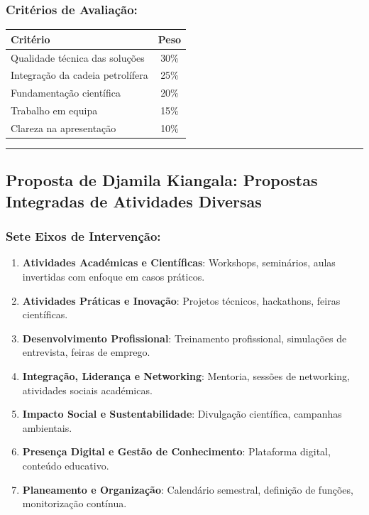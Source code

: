 \documentclass[12pt,a4paper]{article}
\begin{document}
\subsubsection*{Critérios de Avaliação:}
\begin{center}
\small
\begin{tabular}{lc}
\toprule
\textbf{\color{spe-blue}Critério} & \textbf{\color{spe-blue}Peso} \\
\midrule
Qualidade técnica das soluções & 30\% \\
Integração da cadeia petrolífera & 25\% \\
Fundamentação científica & 20\% \\
Trabalho em equipa & 15\% \\
Clareza na apresentação & 10\% \\
\bottomrule
\end{tabular}
\end{center}

\textcolor{spe-secondary}{\hspace{0.5cm}\rule{0.4\linewidth}{0.8pt}}
\subsection{Proposta de Djamila Kiangala: Propostas Integradas de Atividades Diversas}

\subsubsection*{Sete Eixos de Intervenção:}

\begin{enumerate}[itemsep=0.2cm]
    \item \textbf{Atividades Académicas e Científicas}: Workshops, seminários, aulas invertidas com enfoque em casos práticos.
    
    \item \textbf{Atividades Práticas e Inovação}: Projetos técnicos, hackathons, feiras científicas.
    
    \item \textbf{Desenvolvimento Profissional}: Treinamento profissional, simulações de entrevista, feiras de emprego.
    
    \item \textbf{Integração, Liderança e Networking}: Mentoria, sessões de networking, atividades sociais académicas.
    
    \item \textbf{Impacto Social e Sustentabilidade}: Divulgação científica, campanhas ambientais.
    
    \item \textbf{Presença Digital e Gestão de Conhecimento}: Plataforma digital, conteúdo educativo.
    
    \item \textbf{Planeamento e Organização}: Calendário semestral, definição de funções, monitorização contínua.
\end{enumerate}
\end{document}
